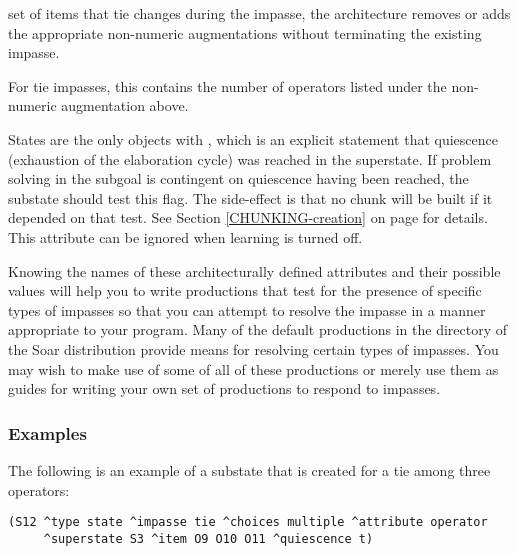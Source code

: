 \begin{description}
	set of items that tie changes during the impasse, the architecture
	removes or adds the appropriate non-numeric augmentations without
	terminating the existing impasse.
	\vspace{-8pt}
\item [\soar{\carat non-numeric-count}] For tie impasses, this contains the number of 
	operators listed under the non-numeric augmentation above.
	\vspace{-8pt}
\item [\soar{\carat quiescence}] States are the only objects with , 
	which is an explicit statement that quiescence (exhaustion of the elaboration cycle) 
	was reached in the superstate.  If problem solving in the subgoal is contingent on 
	quiescence having been reached, the substate should test this flag. The side-effect 
	is that no chunk will be built if it depended on that test. 
	See Section \ref{CHUNKING-creation} on page \pageref{CHUNKING-creation} for
	details. This attribute can be ignored when learning is turned off.
\end{description} 

Knowing the names of these architecturally defined attributes and their
possible values will help you to write productions that test for the presence
of specific types of impasses so that you can attempt to resolve the impasse
in a manner appropriate to your program. Many of the default
productions in the  directory of the Soar distribution
 provide means for resolving
certain types of impasses. You may wish to make use of some of all of these
productions or merely use them as guides for writing your own set of
productions to respond to impasses.

\subsubsection*{Examples}


The following is an example of a substate that is created for a tie among
three operators:
\begin{verbatim}
(S12 ^type state ^impasse tie ^choices multiple ^attribute operator 
     ^superstate S3 ^item O9 O10 O11 ^quiescence t)
\end{verbatim} \vspace{12pt}

